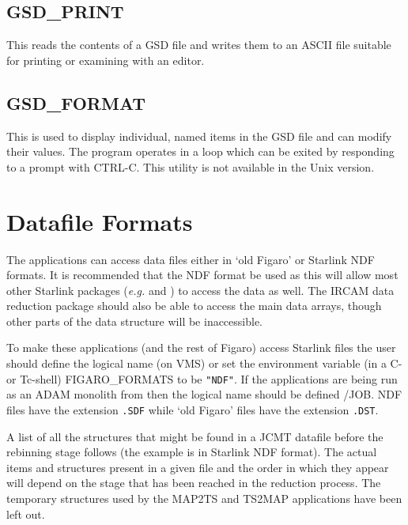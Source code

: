 \documentclass[twoside,11pt,nolof]{starlink}
\begin{document}
\subsection{GSD\_PRINT}

This reads the contents of a GSD file and writes them to an ASCII file
suitable for printing or examining with an editor.

\subsection{GSD\_FORMAT}

This is used to display individual, named items in the GSD file and
can modify their values. The program operates in a loop which can be
exited by responding to a prompt with CTRL-C. This utility is not
available in the Unix version.

\goodbreak

\section{Datafile Formats
\label{sec-data}}

The applications can access data files either in `old Figaro' or
Starlink  NDF formats. It is recommended that the NDF format be used
as this will allow most other Starlink packages (\emph{e.g.}  and
) to access the data as well. The IRCAM data reduction package
should also be able to access the main data arrays, though other parts
of the data structure will be inaccessible.

To make these applications (and the rest of Figaro) access Starlink
 files the user should define the logical name (on VMS) or set the
environment variable (in a C- or Tc-shell) FIGARO\_FORMATS to
be \texttt{"NDF"}. If the applications are being run as an ADAM monolith from
 then the logical name should be defined /JOB. NDF files have the
extension \texttt{.SDF} while `old Figaro' files have the extension \texttt{.DST}.

A list of all the structures that might be found in a JCMT datafile
before the rebinning stage follows (the example is in Starlink NDF
format).  The actual items and  structures present in a given file and
the order in which they appear will depend on the stage that has been
reached in the reduction process. The temporary structures used by the
MAP2TS and TS2MAP applications  have been left out.
\end{document}
